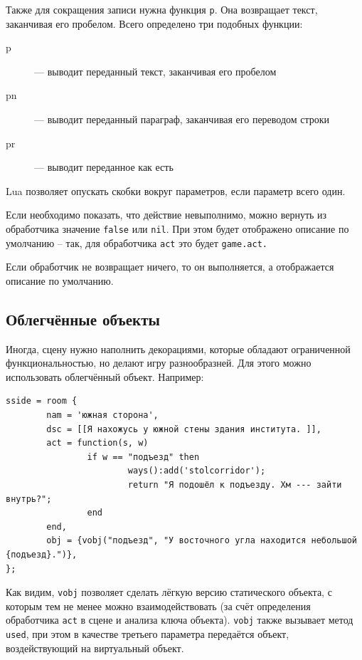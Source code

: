 \documentclass[a4paper,12pt]{article}
\begin{document}
Также для сокращения записи нужна функция \verb/p/. Она возвращает текст, заканчивая его пробелом. Всего определено три подобных функции:

\begin{description}
\item[p] --- выводит переданный текст, заканчивая его пробелом
\item[pn] --- выводит переданный параграф, заканчивая его переводом строки
\item[pr] --- выводит переданное как есть
\end{description}

Lua позволяет опускать скобки вокруг параметров, если параметр всего один.

Если необходимо показать, что действие невыполнимо, можно вернуть из обработчика значение \verb/false/ или \verb/nil/. При этом будет отображено описание по умолчанию -- так, для обработчика \verb/act/ это будет  \verb`game.act.`

Если обработчик не возвращает ничего, то он выполняется, а отображается описание по умолчанию.

\subsection{Облегчённые объекты}

Иногда, сцену нужно наполнить декорациями, которые обладают ограниченной функциональностью, но делают игру разнообразней. Для этого можно использовать облегчённый объект. Например:

\begin{verbatim}
sside = room {
        nam = 'южная сторона',
        dsc = [[Я нахожусь у южной стены здания института. ]],
        act = function(s, w)
                if w == "подъезд" then
                        ways():add('stolcorridor');
                        return "Я подошёл к подъезду. Хм --- зайти внутрь?";
                end
        end,
        obj = {vobj("подъезд", "У восточного угла находится небольшой {подъезд}.")},
};
\end{verbatim}

Как видим, \verb/vobj/ позволяет сделать лёгкую версию статического объекта, с которым тем не менее можно взаимодействовать (за счёт определения обработчика \verb/act/ в сцене и анализа ключа объекта). \verb/vobj/ также вызывает метод \verb/used/, при этом в качестве третьего параметра передаётся объект, воздействующий на виртуальный объект.
\end{document}
